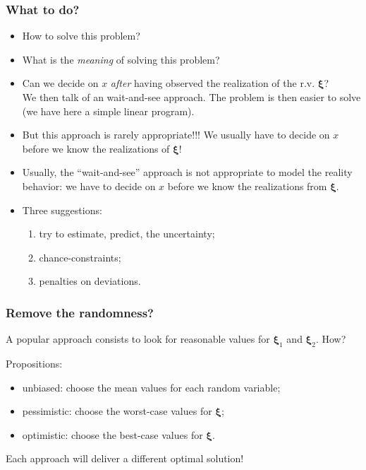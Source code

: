 \documentclass{beamer}
\def\bxi{\boldsymbol\xi}
\def\bxi{\boldsymbol\xi}
\begin{document}
\begin{frame}
	\frametitle{What to do?}
	
	\begin{itemize}
		\item
		How to solve this problem?
		\item
		What is the {\sl meaning} of solving this problem?
		\item
		Can we decide on $x$ {\sl after} having observed the realization of the r.v. $\bxi$?\\
		We then talk of an {\red wait-and-see} approach.
		The problem is then easier to solve (we have here a simple linear program).
		\item
		But this approach is rarely appropriate!!! We usually have to decide on $x$ {\red before} we know the realizations of $\bxi$!
		\item
		Usually, the ``wait-and-see'' approach is not appropriate to model the reality behavior: we have to decide on $x$ before we know the realizations from $\bxi$.
		\item
		Three suggestions:
		\begin{enumerate}
			\item
			try to estimate, predict, the uncertainty;
			\item
			chance-constraints;
			\item
			penalties on deviations.
		\end{enumerate}
	\end{itemize}
	
\end{frame}

\begin{frame}
	\frametitle{Remove the randomness?}
	
	A popular approach consists to look for reasonable values for $\bxi_1$ and $\bxi_2$.
	How?
	
	\mbox{}
	
	Propositions:
	\begin{itemize}
		\item unbiased: choose the mean values for each random variable;
		\item pessimistic: choose the worst-case values for $\bxi$;
		\item optimistic: choose the best-case values for $\bxi$.
	\end{itemize}
	
	Each approach will deliver a different optimal solution!
	
\end{frame}
\end{document}
